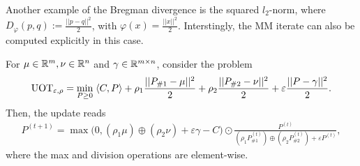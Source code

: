 Another example of the Bregman divergence is the squared $l_2$-norm, where
$D_{\varphi}(p, q) := \frac{|| p - q||^2}{2}$, with $\varphi(x) = \frac{||x||^2}{2}$. Interstingly,
the MM iterate can also be computed explicitly in this case.
\begin{corollary}
  For $\mu \in \mathbb R^m, \nu \in \mathbb R^n$ and $\gamma \in \mathbb R^{m \times n}$,  consider the
  problem
  \begin{equation}
  \label{uot_l2}
      \text{UOT}_{\varepsilon, \rho} =
      \min_{P \geq 0} \; \langle C, P \rangle + \rho_1 \frac{||P_{\# 1} - \mu||^2}{2}
      + \rho_2 \frac{|| P_{\# 2} - \nu ||^2}{2} + \varepsilon  \frac{||P - \gamma||^2}{2}.
  \end{equation}
  Then, the update reads
  \begin{align}
      P^{(t+1)} = \max \Big(0, (\rho_1 \mu) \oplus (\rho_2 \nu) + \varepsilon \gamma - C \Big)
      \odot \frac{P^{(t)}}{(\rho_1 P^{(t)}_{\# 1}) \oplus (\rho_2 P^{(t)}_{\# 2}) + \varepsilon P^{(t)}},
  \end{align}
  where the max and division operations are element-wise.
\end{corollary}




